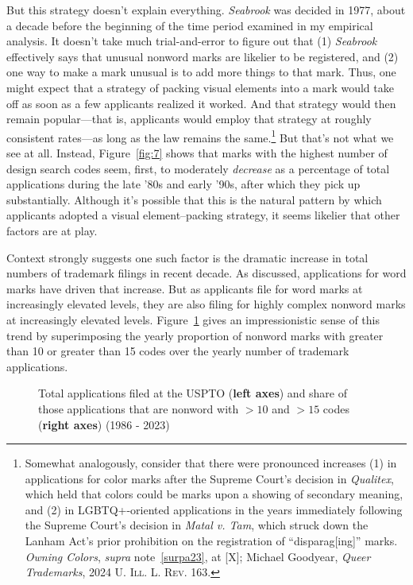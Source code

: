 \documentclass[letterpaper, 11pt, oneside]{article}
\begin{document}
But this strategy doesn't explain everything. \textit{Seabrook} was decided in 1977, about a decade before the beginning of the time period examined in my empirical analysis. It doesn't take much trial-and-error to figure out that (1) \textit{Seabrook} effectively says that unusual nonword marks are likelier to be registered, and (2) one way to make a mark unusual is to add more things to that mark. Thus, one might expect that a strategy of packing visual elements into a mark would take off as soon as a few applicants realized it worked. And that strategy would then remain popular—that is, applicants would employ that strategy at roughly consistent rates—as long as the law remains the same.\footnote{Somewhat analogously, consider that there were pronounced increases (1) in applications for color marks after the Supreme Court's decision in \textit{Qualitex}, which held that colors could be marks upon a showing of secondary meaning, and (2) in LGBTQ+-oriented applications in the years immediately following the Supreme Court's decision in \textit{Matal v. Tam}, which struck down the Lanham Act's prior prohibition on the registration of ``disparag[ing]'' marks. \textit{Owning Colors}, \textit{supra} note~\ref{surpa23}, at [X]; Michael Goodyear, \textit{Queer Trademarks}, 2024 \textsc{U. Ill. L. Rev.} 163.} But that's not what we see at all. Instead, Figure~\ref{fig:7} shows that marks with the highest number of design search codes seem, first, to moderately \textit{decrease} as a percentage of total applications during the late '80s and early '90s, after which they pick up substantially. Although it's possible that this is the natural pattern by which applicants adopted a visual element–packing strategy, it seems likelier that other factors are at play.

Context strongly suggests one such factor is the dramatic increase in total numbers of trademark filings in recent decade. As discussed, applications for word marks have driven that increase. But as applicants file for word marks at increasingly elevated levels, they are also filing for highly complex nonword marks at increasingly elevated levels. Figure~\ref{fig:8} gives an impressionistic sense of this trend by superimposing the yearly proportion of nonword marks with greater than 10 or greater than 15 codes over the yearly number of trademark applications.

\addtocounter{figure}{-3}

\begin{figure}[H]
\centering

\caption{\label{fig:8} Total applications filed at the USPTO (\textbf{\color{oxfordblue}left axes}) and share of those applications that are nonword with $>10$ and $>15$ codes (\textbf{\color{seafoam}right axes}) (1986 - 2023)}
\end{figure}
\end{document}

